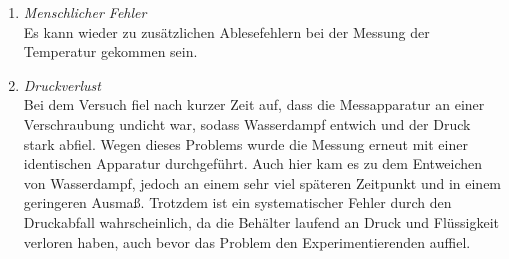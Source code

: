 \begin{enumerate}
  \item \textit{Menschlicher Fehler}\\
    Es kann wieder zu zusätzlichen Ablesefehlern bei der Messung der Temperatur gekommen sein.
  \item \textit{Druckverlust}\\
    Bei dem Versuch fiel nach kurzer Zeit auf, dass die Messapparatur an einer Verschraubung undicht war,
    sodass Wasserdampf entwich und der Druck stark abfiel. Wegen dieses Problems wurde die Messung
    erneut mit einer identischen Apparatur durchgeführt. Auch hier kam es zu dem Entweichen von Wasserdampf,
    jedoch an einem sehr viel späteren Zeitpunkt und in einem geringeren Ausmaß. Trotzdem ist ein systematischer
    Fehler durch den Druckabfall wahrscheinlich, da die Behälter laufend an Druck und Flüssigkeit verloren haben, auch
    bevor das Problem den Experimentierenden auffiel.
\end{enumerate}


